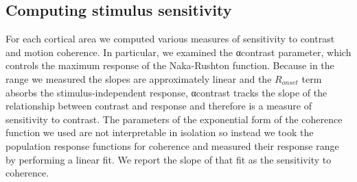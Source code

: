 \subsection{Computing stimulus sensitivity}
For each cortical area we computed various measures of sensitivity to contrast and motion coherence. In particular, we examined the αcontrast parameter, which controls the maximum response of the Naka-Rushton function. Because in the range we measured the slopes are approximately linear and the $R_{onset}$ term absorbs the stimulus-independent response, αcontrast tracks the slope of the relationship between contrast and response and therefore is a measure of sensitivity to contrast. The parameters of the exponential form of the coherence function we used are not interpretable in isolation so instead we took the population response functions for coherence and measured their response range by performing a linear fit. We report the slope of that fit as the sensitivity to coherence.

